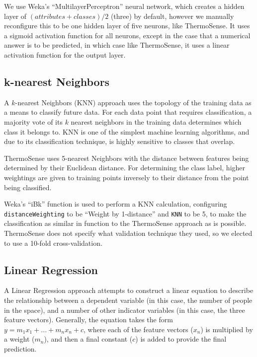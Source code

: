 \documentclass[../thesis/thesis.tex]{subfiles}
\begin{document}
We use Weka's ``MultilayerPerceptron'' neural network, which creates a hidden layer of $(\mathit{attributes} + \mathit{classes}) / 2$ (three) by default, however we manually reconfigure this to be one hidden layer of five neurons, like ThermoSense. It uses a sigmoid activation function for all neurons, except in the case that a numerical answer is to be predicted, in which case like ThermoSense, it uses a linear activation function for the output layer.

\subsection{k-nearest Neighbors}
A $k$-nearest Neighbors (KNN) approach uses the topology of the training data as a means to classify future data. For each data point that requires classification, a majority vote of its $k$ nearest neighbors in the training data determines which class it belongs to. KNN is one of the simplest machine learning algorithms, and due to its classification technique, is highly sensitive to classes that overlap. 

ThermoSense uses 5-nearest Neighbors with the distance between features being determined by their Euclidean distance. For determining the class label, higher weightings are given to training points inversely to their distance from the point being classified.

Weka's ``iBk'' function is used to perform a KNN calculation, configuring \texttt{distanceWeighting} to be ``Weight by 1-distance'' and \texttt{KNN} to be 5, to make the classification as similar in function to the ThermoSense approach as is possible. ThermoSense does not specify what validation technique they used, so we elected to use a 10-fold cross-validation.

\subsection{Linear Regression}
A Linear Regression approach attempts to construct a linear equation to describe the relationship between a dependent variable (in this case, the number of people in the space), and a number of other indicator variables (in this case, the three feature vectors). Generally, the equation takes the form $y = m_1x_1 + ... + m_nx_n + c$, where each of the feature vectors ($x_n$) is multiplied by a weight ($m_n$), and then a final constant ($c$) is added to provide the final prediction.
\end{document}
